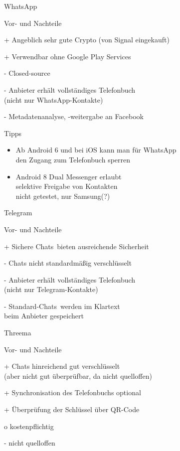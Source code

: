 
\begin{frame}{WhatsApp}
  \begin{blex}{Vor- und Nachteile}
    \item[+] Angeblich sehr gute Crypto (von Signal eingekauft)
    \item[+] Verwendbar ohne Google Play Services
    \item[-] Closed-source
    \item[-] Anbieter erhält vollständiges Telefonbuch\\
             (nicht nur WhatsApp-Kontakte)
    \item[-] Metadatenanalyse, -weitergabe an Facebook
  \end{blex}
  \begin{block}{Tipps}
    \begin{itemize}
      \item Ab Android 6 und bei iOS kann man für WhatsApp\\den Zugang zum Telefonbuch sperren
      \item Android 8 Dual Messenger erlaubt\\selektive Freigabe von Kontakten\\
            \scriptsize nicht getestet, nur Samsung(?)
    \end{itemize}
  \end{block}
\end{frame}

\begin{frame}{Telegram}
  \begin{blex}{Vor- und Nachteile}
    \item[+] \glqq Sichere Chats\grqq\ bieten ausreichende Sicherheit
    \item[-] Chats nicht standardmäßig verschlüsselt
    \item[-] Anbieter erhält vollständiges Telefonbuch\\ (nicht nur Telegram-Kontakte)
    \item[-] \glqq Standard-Chats\grqq\ werden im Klartext\\beim Anbieter gespeichert
  \end{blex}
\end{frame}

\begin{frame}{Threema}
  \begin{blex}{Vor- und Nachteile}
    \item[+] Chats hinreichend gut verschlüsselt\\(aber nicht gut überprüfbar, da nicht quelloffen)
    \item[+] Synchronisation des Telefonbuchs optional
    \item[+] Überprüfung der Schlüssel über QR-Code
    \item[o] kostenpflichtig
    \item[-] nicht quelloffen
  \end{blex}
\end{frame}

